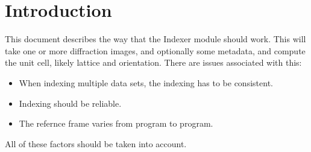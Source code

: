 \documentclass[a4paper, 11pt]{article}
\begin{document}
\section{Introduction}

This document describes the way that the Indexer module should work. This will
take one or more diffraction images, and optionally some metadata, and
compute the unit cell, likely lattice and orientation. There are issues 
associated with this:

\begin{itemize}
\item{When indexing multiple data sets, the indexing has to be consistent.}
\item{Indexing should be reliable.}
\item{The refernce frame varies from program to program.}
\end{itemize}

All of these factors should be taken into account.
\end{document}
